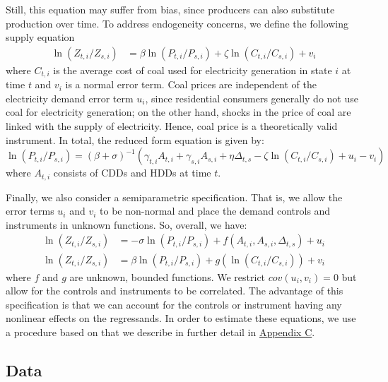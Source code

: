 \documentclass[11pt,a4paper,leqno]{extarticle}
\begin{document}
	Still, this equation may suffer from bias, since producers can also substitute production over time. To address endogeneity concerns, we define the following supply equation
	\begin{align}
	\ln (Z_{ t, i} / Z_{ s, i}) &= \beta \ln (P_{t,i} / P_{s,i}) + \zeta \ln (C_{t,i} / C_{s,i}) + v_{i}
	\end{align}
	where $C_{t,i}$ is the average cost of coal used for electricity generation in state $i$ at time $t$ and $v_i$ is a normal error term. Coal prices are independent of the electricity demand error term $u_i$, since residential consumers generally do not  use coal for electricity generation; on the other hand, shocks in the price of coal are linked with the supply of electricity. Hence, coal price is a theoretically valid instrument.  In total, the reduced form equation is given by:
	\begin{equation}
	\ln (P_{t,i} / P_{s,i}) = \left( \beta + \sigma \right)^{-1} \left( \gamma_{t,i} A_{t,i} + \gamma_{s,i} A_{s,i} + \eta \Delta_{t,s} - \zeta \ln (C_{t,i} / C_{s,i}) + u_{i} - v_i \right)  
	\end{equation}
	where $A_{t,i}$ consists of CDDs and HDDs at time $t$. 
	
	Finally, we also consider a semiparametric specification. That is, we allow the error terms $u_i$ and $v_i$ to be non-normal and place the demand controls and instruments in unknown functions. So, overall, we have:
	\begin{align} \label{eq:pariv1}
	\ln (Z_{ t, i} / Z_{ s, i}) &= -\sigma \ln (P_{t,i} / P_{s,i}) +  f \left( A_{t,i}, A_{s,i}, \Delta_{t,s} \right) + u_i \\
	\ln (Z_{ t, i} / Z_{ s, i}) &= \beta \ln (P_{t,i} / P_{s,i}) + g \left( \ln (C_{t,i} / C_{s,i})  \right) + v_{i} \label{eq:pariv2}
	\end{align}
	where $f$ and $g$ are unknown, bounded functions. We restrict $cov(u_i, v_i) = 0$ but allow for the controls and instruments to be correlated. The advantage of this specification is that we can account for the controls or instrument having any nonlinear effects on the regressands. In order to estimate these equations, we use a procedure based on \citet{Newey} that we describe in further detail in \hyperref[sec:AppendixC]{Appendix C}.  \noindent
	
	\noindent
	\subsection{Data}
	
\end{document}
